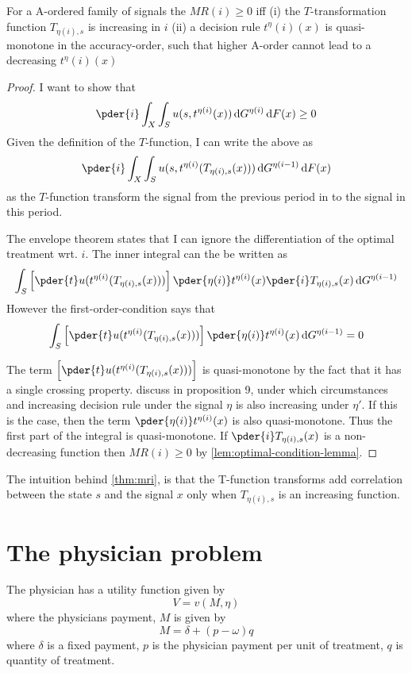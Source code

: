\documentclass[11pt,a4paper,oneside]{article}
\begin{document}
\begin{theorem}\label{thm:mri}
For a A-ordered family of signals the \(MR(i)\geq0\) iff (i) the \(T\)-transformation function \(T_{\eta(i),s}\) is increasing in \(i\) (ii) a decision rule \(t^\eta(i)(x)\) is quasi-monotone in the accuracy-order, such that higher A-order cannot lead to a decreasing \(t^\eta(i)(x)\)
\end{theorem}
\begin{proof}
I want to show that
\[
	\pder{i}\int_X\int_S u(s,t^{\eta(i)}(x))\dif G^{\eta(i)}\dif F(x)\geq0
\]
Given the definition of the \(T\)-function, I can write the above as
\[
	\pder{i}\int_X\int_S u(s,t^{\eta(i)}(T_{\eta(i),s}(x)))\dif G^{\eta(i-1)}\dif F(x)
\]
as the \(T\)-function transform the signal from the previous period in to the signal in this period.

The envelope theorem states that I can ignore the differentiation of the optimal treatment wrt. \(i\). The inner integral can the be written as
\[
	\int_S \left[\pder{t}u(t^{\eta(i)}(T_{\eta(i),s}(x)))\right]\pder{\eta(i)}t^{\eta(i)}(x)\pder{i}T_{\eta(i),s}(x)\dif G^{\eta(i-1)}
\]
However the first-order-condition says that
\[
	\int_S \left[\pder{t}u(t^{\eta(i)}(T_{\eta(i),s}(x)))\right]\pder{\eta(i)}t^{\eta(i)}(x)\dif G^{\eta(i-1)}=0
\]

The term \(\left[\pder{t}u(t^{\eta(i)}(T_{\eta(i),s}(x)))\right]\) is quasi-monotone by the fact that it has a single crossing property. \textcite{Quah2009} discuss in proposition 9, under which circumstances and increasing decision rule under the signal \(\eta\) is also increasing under \(\eta'\). If this is the case, then the term \(\pder{\eta(i)}t^{\eta(i)}(x)\) is also quasi-monotone. Thus the first part of the integral is quasi-monotone. If \(\pder{i}T_{\eta(i),s}(x)\) is a non-decreasing function then \(MR(i)\geq0\) by \cref{lem:optimal-condition-lemma}.
\end{proof}
The intuition behind \cref{thm:mri}, is that the T-function transforms add correlation between the state \(s\) and the signal \(x\) only when \(T_{\eta(i),s}\) is an increasing function.

\section{The physician problem}
The physician has a utility function given by
\[
	V=v(M,\eta)
\]
where the physicians payment, \(M\) is given by
\[
	M=\delta+(p-\omega)q
\]
where \(\delta\) is a fixed payment, \(p\) is the physician payment per unit of treatment, \(q\) is quantity of treatment.
\end{document}
